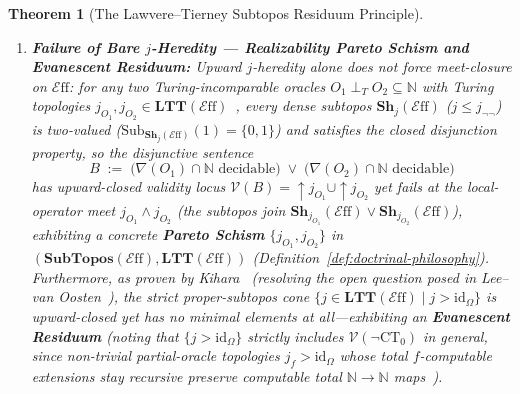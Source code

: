 \documentclass[10pt,twoside,openright]{book}
\theoremstyle{crmplain}
\newtheorem{theorem}{Theorem}[section]
\theoremstyle{crmdef}
\theoremstyle{crmremark}
\newcommand{\Eff}{\mathcal{E}\mathrm{ff}}
\begin{document}
\begin{theorem}[The Lawvere--Tierney Subtopos Residuum Principle]
\begin{enumerate}[label=(\roman*),leftmargin=2em]
  \item \textbf{Failure of Bare $j$-Heredity --- Realizability Pareto Schism and Evanescent Residuum:} Upward $j$-heredity alone does not force meet-closure on $\Eff$: for any two Turing-incomparable oracles $O_1 \perp_T O_2 \subseteq \mathbb{N}$ with Turing topologies $j_{O_1}, j_{O_2} \in \mathbf{LTT}(\Eff)$~\cite{LeeVanOosten13}, every dense subtopos $\mathbf{Sh}_j(\Eff)$ ($j \le j_{\neg\neg}$) is two-valued ($\mathrm{Sub}_{\mathbf{Sh}_j(\Eff)}(1) = \{0, 1\}$) and satisfies the closed disjunction property, so the disjunctive sentence
  \[
    B \;:=\; \bigl(\nabla(O_1) \cap \mathbb{N}\text{ decidable}\bigr) \;\lor\; \bigl(\nabla(O_2) \cap \mathbb{N}\text{ decidable}\bigr)
  \]
  has upward-closed validity locus $\mathcal{V}(B) = {\uparrow} j_{O_1} \cup {\uparrow} j_{O_2}$ yet fails at the local-operator meet $j_{O_1} \wedge j_{O_2}$ (the subtopos join $\mathbf{Sh}_{j_{O_1}}(\Eff) \vee\allowbreak \mathbf{Sh}_{j_{O_2}}(\Eff)$), exhibiting a concrete \textbf{Pareto Schism} $\{j_{O_1}, j_{O_2}\}$ in $(\mathbf{SubTopos}(\Eff),\allowbreak \mathbf{LTT}(\Eff))$ (Definition~\ref{def:doctrinal-philosophy}). Furthermore, as proven by Kihara~\cite[\S 4]{Kihara23} (resolving the open question posed in Lee--van Oosten~\cite{LeeVanOosten13}), the strict proper-subtopos cone $\{j \in \mathbf{LTT}(\Eff) \mid j > \mathrm{id}_\Omega\}$ is upward-closed yet has no minimal elements at all---exhibiting an \textbf{Evanescent Residuum} (noting that $\{j > \mathrm{id}_\Omega\}$ strictly includes $\mathcal{V}(\neg\mathrm{CT}_0)$ in general, since non-trivial partial-oracle topologies $j_f > \mathrm{id}_\Omega$ whose total $f$-computable extensions stay recursive preserve computable total $\mathbb{N} \to \mathbb{N}$ maps~\cite{LeeVanOosten13}).

\end{enumerate}

\end{theorem}
\end{document}
